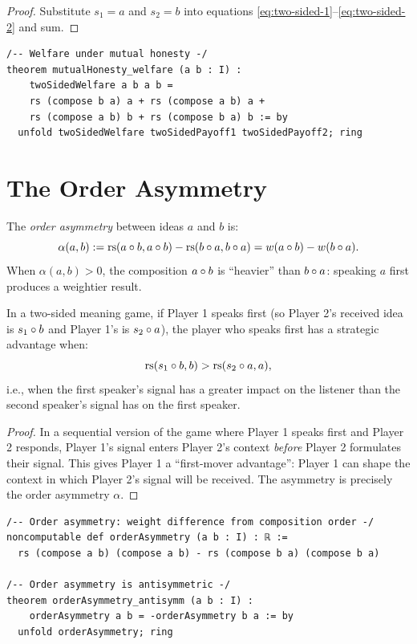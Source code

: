 \begin{proof}
Substitute $s_1 = a$ and $s_2 = b$ into equations
\eqref{eq:two-sided-1}--\eqref{eq:two-sided-2} and sum.
\end{proof}

\begin{lstlisting}[caption={Lean 4: Mutual honesty welfare}]
/-- Welfare under mutual honesty -/
theorem mutualHonesty_welfare (a b : I) :
    twoSidedWelfare a b a b =
    rs (compose b a) a + rs (compose a b) a +
    rs (compose a b) b + rs (compose b a) b := by
  unfold twoSidedWelfare twoSidedPayoff1 twoSidedPayoff2; ring
\end{lstlisting}


\section{The Order Asymmetry}

\begin{definition}
\label{def:order-asymmetry}
The \emph{order asymmetry} between ideas $a$ and $b$ is:
\[
\alpha(a, b) := \mathrm{rs}(a \circ b, a \circ b) - \mathrm{rs}(b \circ a, b \circ a)
= w(a \circ b) - w(b \circ a).
\]
When $\alpha(a, b) > 0$, the composition $a \circ b$ is ``heavier'' than
$b \circ a$: speaking $a$ first produces a weightier result.
\end{definition}

\begin{theorem}
\label{thm:agenda-power}
In a two-sided meaning game, if Player 1 speaks first (so Player 2's received
idea is $s_1 \circ b$ and Player 1's is $s_2 \circ a$), the player who
speaks first has a strategic advantage when:
\[
\mathrm{rs}(s_1 \circ b, b) > \mathrm{rs}(s_2 \circ a, a),
\]
i.e., when the first speaker's signal has a greater impact on the listener
than the second speaker's signal has on the first speaker.
\end{theorem}

\begin{proof}
In a sequential version of the game where Player 1 speaks first and Player 2
responds, Player 1's signal enters Player 2's context \emph{before} Player 2
formulates their signal. This gives Player 1 a ``first-mover advantage'':
Player 1 can shape the context in which Player 2's signal will be received.
The asymmetry is precisely the order asymmetry $\alpha$.
\end{proof}

\begin{lstlisting}[caption={Lean 4: Order asymmetry}]
/-- Order asymmetry: weight difference from composition order -/
noncomputable def orderAsymmetry (a b : I) : ℝ :=
  rs (compose a b) (compose a b) - rs (compose b a) (compose b a)

/-- Order asymmetry is antisymmetric -/
theorem orderAsymmetry_antisymm (a b : I) :
    orderAsymmetry a b = -orderAsymmetry b a := by
  unfold orderAsymmetry; ring
\end{lstlisting}


